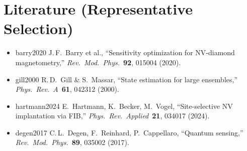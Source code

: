 \section{Literature (Representative Selection)}
\label{sec:bib}

\begin{itemize}[leftmargin=*,itemsep=1pt,label={}]
  \item \lbrack barry2020\rbrack{} J.\,F.\ Barry et al., ``Sensitivity optimization for NV-diamond
        magnetometry,'' \textit{Rev.\ Mod.\ Phys.}\ \textbf{92}, 015004 (2020).
  \item \lbrack gill2000\rbrack{} R.\,D.\ Gill \& S.\ Massar, ``State estimation for large ensembles,''
        \textit{Phys.\ Rev.\ A}\ \textbf{61}, 042312 (2000).
  \item \lbrack hartmann2024\rbrack{} E.\ Hartmann, K.\ Becker, M.\ Vogel, ``Site-selective NV
        implantation via FIB,'' \textit{Phys.\ Rev.\ Applied}\ \textbf{21}, 034017 (2024).
  \item \lbrack degen2017\rbrack{} C.\,L.\ Degen, F.\ Reinhard, P.\ Cappellaro,
        ``Quantum sensing,'' \textit{Rev.\ Mod.\ Phys.}\ \textbf{89}, 035002 (2017).
\end{itemize}

\newpage

